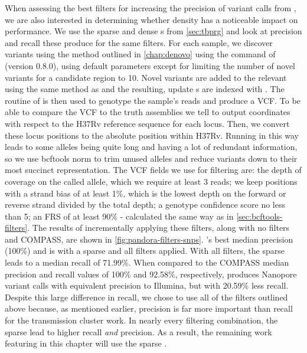 When assessing the best filters for increasing the precision of variant calls from \pandora{}, we are also interested in determining whether \prg{} density has a noticeable impact on performance. We use the sparse and dense \prg{}s from \autoref{sec:tbprg} and look at precision and recall these produce for the same filters.
For each sample, we discover \denovo{} variants using the method outlined in \autoref{chap:denovo} using the  command of \pandora{} (version 0.8.0), using default parameters except for limiting the number of novel variants for a candidate region to 10. Novel variants are added to the relevant \prg{} using the same method as  and the resulting, update \prg{}s are indexed with \pandora{}. The  routine of \pandora{} is then used to genotype the sample's reads and produce a VCF. To be able to compare the \pandora{} VCF to the truth assemblies we tell \pandora{} to output coordinates with respect to the H37Rv reference sequence for each locus. Then, we convert these locus positions to the absolute position within H37Rv. Running \pandora{} in this way leads to some alleles being quite long and having a lot of redundant information, so we use bcftools norm to trim unused alleles and reduce variants down to their most succinct representation.
The \pandora{} VCF fields we use for filtering are: the depth of coverage on the called allele, which we require at least 3 reads; we keep positions with a strand bias of at least 1\%, which is the lowest depth on the forward or reverse strand divided by the total depth; a genotype confidence score no less than 5; an FRS of at least 90\%  - calculated the same way as in \autoref{sec:bcftools-filters}.
The results of incrementally applying these filters, along with no filters and COMPASS, are shown in \autoref{fig:pandora-filters-snps}. \pandora{}'s best median precision (100\%) and
is with a sparse \prg{} and all filters applied. With all filters, the sparse \prg{} leads to a median recall of 71.99\%. When compared to the COMPASS median precision and recall values
of 100\% and 92.58\%, respectively, \pandora{} produces Nanopore variant calls
with equivalent precision to Illumina, but with 20.59\% less recall. Despite this large difference in recall, we chose to use all of the filters outlined above because, as mentioned earlier, precision is far more important than recall for the transmission cluster work.
In nearly every filtering combination, the sparse \prg{} lead to higher recall \emph{and} precision. As a result, the remaining work featuring \pandora{} in this chapter will use the sparse \prg{}.


